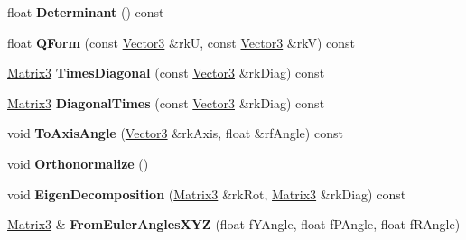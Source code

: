 \begin{DoxyCompactItemize}
\item 
float {\bfseries Determinant} () const \hypertarget{class_magnum_1_1_matrix3_a004ef65ae71e3afa987d6ed0090dd223}{}\label{class_magnum_1_1_matrix3_a004ef65ae71e3afa987d6ed0090dd223}

\item 
float {\bfseries Q\+Form} (const \hyperlink{class_magnum_1_1_vector3}{Vector3} \&rkU, const \hyperlink{class_magnum_1_1_vector3}{Vector3} \&rkV) const \hypertarget{class_magnum_1_1_matrix3_a45093207be6c6fd4e5a5e4755e8a89ac}{}\label{class_magnum_1_1_matrix3_a45093207be6c6fd4e5a5e4755e8a89ac}

\item 
\hyperlink{class_magnum_1_1_matrix3}{Matrix3} {\bfseries Times\+Diagonal} (const \hyperlink{class_magnum_1_1_vector3}{Vector3} \&rk\+Diag) const \hypertarget{class_magnum_1_1_matrix3_a0e4f4b02e6420fabda15b2a2de4c9b53}{}\label{class_magnum_1_1_matrix3_a0e4f4b02e6420fabda15b2a2de4c9b53}

\item 
\hyperlink{class_magnum_1_1_matrix3}{Matrix3} {\bfseries Diagonal\+Times} (const \hyperlink{class_magnum_1_1_vector3}{Vector3} \&rk\+Diag) const \hypertarget{class_magnum_1_1_matrix3_a578e7c96e639eaee5b9f46c19cb08c13}{}\label{class_magnum_1_1_matrix3_a578e7c96e639eaee5b9f46c19cb08c13}

\item 
void {\bfseries To\+Axis\+Angle} (\hyperlink{class_magnum_1_1_vector3}{Vector3} \&rk\+Axis, float \&rf\+Angle) const \hypertarget{class_magnum_1_1_matrix3_ac19011f9fa179f1874ace4d0f16f55dc}{}\label{class_magnum_1_1_matrix3_ac19011f9fa179f1874ace4d0f16f55dc}

\item 
void {\bfseries Orthonormalize} ()\hypertarget{class_magnum_1_1_matrix3_a8c7d501c01975a61298fc38a8b933f6f}{}\label{class_magnum_1_1_matrix3_a8c7d501c01975a61298fc38a8b933f6f}

\item 
void {\bfseries Eigen\+Decomposition} (\hyperlink{class_magnum_1_1_matrix3}{Matrix3} \&rk\+Rot, \hyperlink{class_magnum_1_1_matrix3}{Matrix3} \&rk\+Diag) const \hypertarget{class_magnum_1_1_matrix3_a2dccc8da559f4692c01d793552700bb9}{}\label{class_magnum_1_1_matrix3_a2dccc8da559f4692c01d793552700bb9}

\item 
\hyperlink{class_magnum_1_1_matrix3}{Matrix3} \& {\bfseries From\+Euler\+Angles\+X\+YZ} (float f\+Y\+Angle, float f\+P\+Angle, float f\+R\+Angle)\hypertarget{class_magnum_1_1_matrix3_a1d74c17fe0abf80870b4dafb1bf55cd2}{}\label{class_magnum_1_1_matrix3_a1d74c17fe0abf80870b4dafb1bf55cd2}


\end{DoxyCompactItemize}
